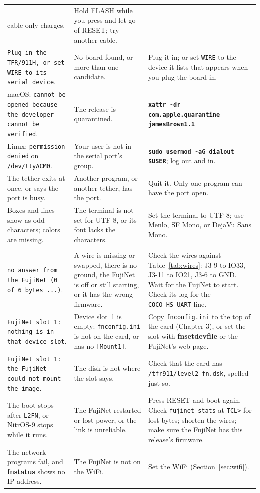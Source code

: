 \documentclass[10pt,twoside,openany]{book}
\newcommand{\release}{jamesBrown1.1}
\newcommand{\cmd}[1]{\textbf{#1}}            %
\newcommand{\file}[1]{\texttt{#1}}           %
\newcommand{\key}[1]{\textsf{\small #1}}     %
\newcommand{\type}[1]{\texttt{\textbf{#1}}}  %
\begin{document}
{\begin{longtable}{@{}>{\raggedright\arraybackslash}p{1.7in}>{\raggedright\arraybackslash}p{1.5in}>{\raggedright\arraybackslash}p{2.9in}@{}}
cable only charges. & Hold \key{FLASH} while you press and let go of
\key{RESET}; try another cable.\\
\texttt{Plug in the TFR/911H, or set WIRE to its serial device}. & No
board found, or more than one candidate. & Plug it in; or set
\texttt{WIRE} to the device it lists that appears when you plug the board
in.\\
macOS: \texttt{cannot be opened because the developer cannot be
verified}. & The release is quarantined. & \type{xattr -dr
com.apple.quarantine \release}\\
Linux: \texttt{permission denied} on \file{/dev/ttyACM0}. & Your user is
not in the serial port's group. & \type{sudo usermod -aG dialout \$USER};
log out and in.\\
The tether exits at once, or says the port is busy. & Another program,
or another tether, has the port. & Quit it. Only one program can have
the port open.\\
Boxes and lines show as odd characters; colors are missing. & The
terminal is not set for UTF-8, or its font lacks the characters. & Set
the terminal to UTF-8; use Menlo, SF Mono, or DejaVu Sans Mono.\\[4pt]
\multicolumn{3}{@{}l}{\sffamily\bfseries The link and booting}\\[2pt]
\texttt{no answer from the FujiNet (0 of 6 bytes ...)}. & A wire is
missing or swapped, there is no ground, the FujiNet is off or still
starting, or it has the wrong firmware. & Check the wires against
Table~\ref{tab:wires}: J3-9 to IO33, J3-11 to IO21, J3-6 to GND. Wait for
the FujiNet to start. Check its log for the \texttt{COCO\_HS\_UART}
line.\\
\texttt{FujiNet slot 1: nothing is in that device slot}. & Device slot~1
is empty: \file{fnconfig.ini} is not on the card, or has no
\texttt{[Mount1]}. & Copy \file{fnconfig.ini} to the top of the card
(Chapter 3), or set the slot with \cmd{fnsetdevfile} or the FujiNet's web
page.\\
\texttt{FujiNet slot 1: the FujiNet could not mount the image}. & The
disk is not where the slot says. & Check that the card has
\file{/tfr911/level2-fn.dsk}, spelled just so.\\
The boot stops after \texttt{L2FN}, or NitrOS-9 stops while it runs. &
The FujiNet restarted or lost power, or the link is unreliable. & Press
\key{RESET} and boot again. Check \texttt{fujinet stats} at
\texttt{TCL>} for lost bytes; shorten the wires; make sure the FujiNet has
this release's firmware.\\
The network programs fail, and \cmd{fnstatus} shows no IP address. & The
FujiNet is not on the WiFi. & Set the WiFi (Section~\ref{sec:wifi}).\\
\bottomrule
\end{longtable}
}
\end{document}
